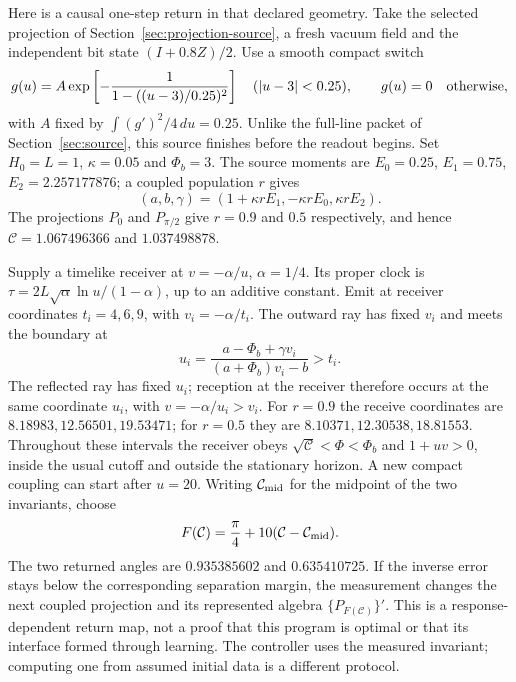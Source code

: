 Here is a causal one-step return in that declared geometry. Take the selected
projection of Section~\ref{sec:projection-source}, a fresh vacuum field and
the independent bit state $(I+0.8Z)/2$. Use a smooth compact switch
\begin{equation}\label{eq:compact-return-switch}
 g(u)=A\exp\left[-\frac{1}{1-((u-3)/0.25)^2}\right]
 \quad (|u-3|<0.25),\qquad g(u)=0\quad\hbox{otherwise},
\end{equation}
with $A$ fixed by $\int(g')^2/4\,du=0.25$. Unlike the full-line packet of
Section~\ref{sec:source}, this source finishes before the readout begins.
Set $H_0=L=1$, $\kappa=0.05$ and $\Phi_b=3$. The source moments are
$E_0=0.25$, $E_1=0.75$, $E_2=2.257177876$; a coupled population $r$ gives
\[
 (a,b,\gamma)=(1+\kappa rE_1,-\kappa rE_0,\kappa rE_2).
\]
The projections $P_0$ and $P_{\pi/2}$ give $r=0.9$ and $0.5$ respectively,
and hence $\mathcal C=1.067496366$ and $1.037498878$.

Supply a timelike receiver at $v=-\alpha/u$, $\alpha=1/4$. Its proper clock is
$\tau=2L\sqrt\alpha\ln u/(1-\alpha)$, up to an additive constant.
Emit at receiver coordinates $t_i=4,6,9$, with $v_i=-\alpha/t_i$. The outward
ray has fixed $v_i$ and meets the boundary at
\[
 u_i=\frac{a-\Phi_b+\gamma v_i}{(a+\Phi_b)v_i-b}>t_i.
\]
The reflected ray has fixed $u_i$; reception at the receiver therefore occurs
at the same coordinate $u_i$, with $v=-\alpha/u_i>v_i$.
For $r=0.9$ the receive coordinates are $8.18983,12.56501,19.53471$;
for $r=0.5$ they are $8.10371,12.30538,18.81553$. Throughout these intervals
the receiver obeys $\sqrt{\mathcal C}<\Phi<\Phi_b$ and $1+uv>0$, inside the
usual cutoff and outside the stationary horizon. A new compact coupling can
start after $u=20$.
Writing $\mathcal C_{\rm mid}$ for the midpoint of the two invariants, choose
\begin{equation}\label{eq:return-program}
 F(\mathcal C)=\frac\pi4+10(\mathcal C-\mathcal C_{\rm mid}).
\end{equation}
The two returned angles are $0.935385602$ and $0.635410725$. If the inverse
error stays below the corresponding separation margin, the measurement changes
the next coupled projection and its represented algebra $\{P_{F(\mathcal C)}\}'$.
This is a response-dependent return map, not a proof that this program is optimal
or that its interface formed through learning. The controller uses the measured
invariant; computing one from assumed initial data is a different protocol.

